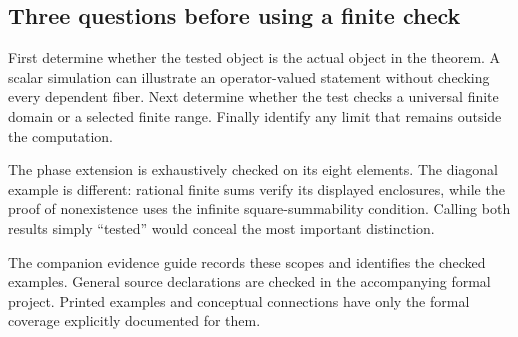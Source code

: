 \subsection{Three questions before using a finite check}
First determine whether the tested object is the actual object in the theorem. A scalar simulation can illustrate an operator-valued statement without checking every dependent fiber. Next determine whether the test checks a universal finite domain or a selected finite range. Finally identify any limit that remains outside the computation.

The phase extension is exhaustively checked on its eight elements. The diagonal example is different: rational finite sums verify its displayed enclosures, while the proof of nonexistence uses the infinite square-summability condition. Calling both results simply ``tested'' would conceal the most important distinction.

The companion evidence guide records these scopes and identifies the checked examples. General source declarations are checked in the accompanying formal project. Printed examples and conceptual connections have only the formal coverage explicitly documented for them.
